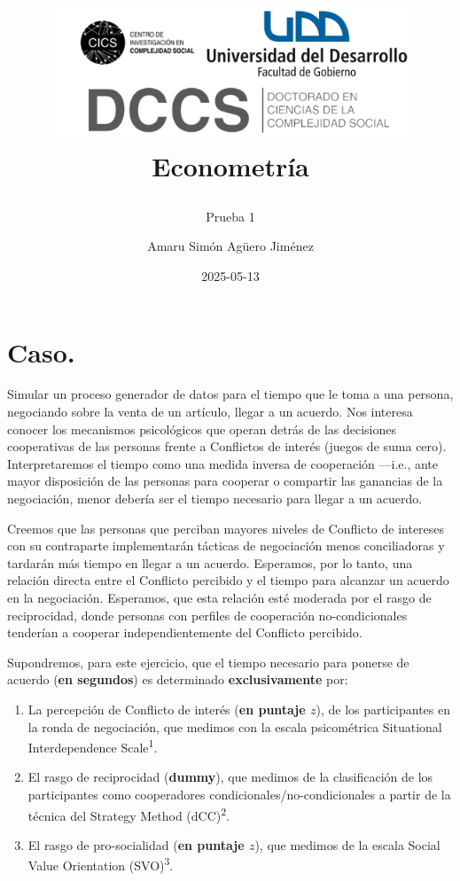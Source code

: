 \documentclass[
  spanish,
  10pt,
]{article}
\title{\begin{center}
  \includegraphics[height=4cm]{logo.png} \\[1cm]
  \Large Econometría \\
\end{center}}
\subtitle{Prueba 1}
\author{Amaru Simón Agüero Jiménez}
\date{2025-05-13}
\renewcommand*\contentsname{Tabla de contenidos}
\newcommand\contentsname{Tabla de contenidos}
\begin{document}
\maketitle

\renewcommand*\contentsname{Tabla de contenidos}
{
\hypersetup{linkcolor=}
\setcounter{tocdepth}{3}
\tableofcontents
}

\section{Caso.}\label{caso.}

Simular un proceso generador de datos para el tiempo que le toma a una
persona, negociando sobre la venta de un artículo, llegar a un acuerdo.
Nos interesa conocer los mecanismos psicológicos que operan detrás de
las decisiones cooperativas de las personas frente a Conflictos de
interés (juegos de suma cero). Interpretaremos el tiempo como una medida
inversa de cooperación ---i.e., ante mayor disposición de las personas
para cooperar o compartir las ganancias de la negociación, menor debería
ser el tiempo necesario para llegar a un acuerdo.

Creemos que las personas que perciban mayores niveles de Conflicto de
intereses con su contraparte implementarán tácticas de negociación menos
conciliadoras y tardarán más tiempo en llegar a un acuerdo. Esperamos,
por lo tanto, una relación directa entre el Conflicto percibido y el
tiempo para alcanzar un acuerdo en la negociación. Esperamos, que esta
relación esté moderada por el rasgo de reciprocidad, donde personas con
perfiles de cooperación no-condicionales tenderían a cooperar
independientemente del Conflicto percibido.

Supondremos, para este ejercicio, que el tiempo necesario para ponerse
de acuerdo (\textbf{en segundos}) es determinado \textbf{exclusivamente}
por:

\begin{enumerate}
\def\labelenumi{\arabic{enumi}.}
\item
  La percepción de Conflicto de interés (\textbf{en puntaje \(z\)}), de
  los participantes en la ronda de negociación, que medimos con la
  escala psicométrica Situational Interdependence
  Scale\textsuperscript{1}.
\item
  El rasgo de reciprocidad (\textbf{dummy}), que medimos de la
  clasificación de los participantes como cooperadores
  condicionales/no-condicionales a partir de la técnica del Strategy
  Method (dCC)\textsuperscript{2}.
\item
  El rasgo de pro-socialidad (\textbf{en puntaje \(z\)}), que medimos de
  la escala Social Value Orientation (SVO)\textsuperscript{3}.
\end{enumerate}
\end{document}
